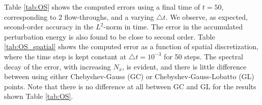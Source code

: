 \documentclass[preprint]{elsarticle}
\begin{document}
Table \ref{tab:OS} shows the computed errors using a final time of $t=50$, corresponding to 2 flow-throughs, and a varying $\triangle t$. We observe, as expected, second-order accuracy in the $L^2$-norm in time. The error in the accumulated perturbation energy is also found to be close to second order. Table \ref{tab:OS_spatial} shows the computed error as a function of spatial discretization, where the time step is kept constant at $\triangle t=10^{-3}$ for 50 steps. The spectral decay of the error, with increasing $N_x$, is evident, and there is little difference between using either Chebyshev-Gauss (GC) or Chebyshev-Gauss-Lobatto (GL) points. Note that there is no difference at all between GC and GL for the results shown Table \ref{tab:OS}.
\end{document}

